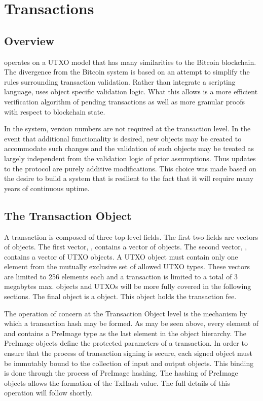 \section{Transactions}
\subsection{Overview}



\LayerTwo{} operates on a UTXO model that has many similarities to the
Bitcoin blockchain.
The divergence from the Bitcoin system is based on an attempt to
simplify the rules surrounding transaction validation.
Rather than integrate a scripting language, \LayerTwo{} uses object
specific validation logic.
What this allows is a more efficient verification algorithm of pending
transactions as well as more granular proofs with respect to blockchain
state.

In the \LayerTwo{} system, version numbers are not required at the
transaction level.
In the event that additional functionality is desired, new objects may
be created to accommodate such changes and the validation of such
objects may be treated as largely independent from the validation logic
of prior assumptions.
Thus updates to the protocol are purely additive modifications.
This choice was made based on the desire to build a system that is
resilient to the fact that it will require many years of continuous
uptime.


\subsection{The Transaction Object}

A transaction is composed of three top-level fields.
The first two fields are vectors of objects.
The first vector, \Vin{}, contains a vector of \TxIn{} objects.
The second vector, \Vout{}, contains a vector of UTXO objects.
A UTXO object must contain only one element from the mutually exclusive set of
allowed UTXO types.
These vectors are limited to 256 elements each and a transaction is limited to
a total of 3 megabytes max.
\TxIn{} objects and UTXOs will be more fully covered in the following sections.
The final object is a \Fee{} object.
This object holds the transaction fee.

The operation of concern at the Transaction Object level is the mechanism by
which a transaction hash may be formed.
As may be seen above, every element of \Vin{} and \Vout{} contains
a PreImage type as
the last element in the object hierarchy.
The PreImage objects define the protected parameters of a transaction.
In order to ensure that the process of transaction signing is secure, each
signed object must be immutably bound to the collection of input and output
objects.
This binding is done through the process of PreImage hashing.
The hashing of PreImage objects allows the formation of the TxHash value.
The full details of this operation will follow shortly.

